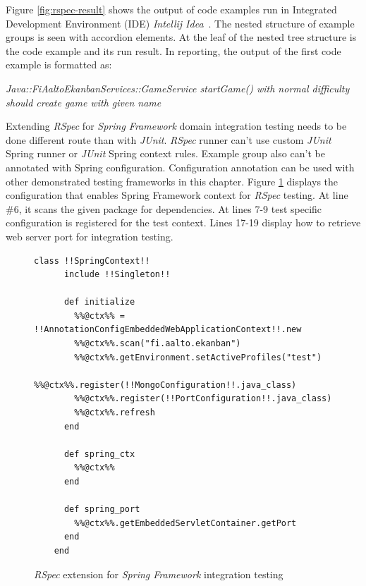     Figure \ref{fig:rspec-result} shows the output of code examples run in Integrated Development Environment (IDE) \textit{Intellij Idea}~\cite{intellij}.
    The nested structure of example groups
    is seen with accordion elements. At the leaf of the nested tree structure is the code example and its run result. In
    reporting, the output of the first code example is formatted as:
    \begin{center}
    \textit{Java::FiAaltoEkanbanServices::GameService startGame() with normal difficulty should create game with given name}
    \end{center}

    Extending \textit{RSpec} for \textit{Spring Framework} domain integration testing needs to be done different route than with \textit{JUnit}. \textit{RSpec}
    runner can't use custom \textit{JUnit} Spring runner or \textit{JUnit} Spring context rules. Example group also can't be annotated with
    Spring configuration. Configuration annotation can be used with other demonstrated testing frameworks in this chapter. Figure \ref{fig:rspec-config}
    displays the configuration that enables Spring Framework context for \textit{RSpec} testing. At line \#6, it scans the given
    package for dependencies. At lines 7-9 test specific configuration is registered for the test context. Lines 17-19
    display how to retrieve web server port for integration testing.

    \begin{figure}[H]
        \begin{lstlisting}[style=ruby]
    class !!SpringContext!!
      include !!Singleton!!

      def initialize
        %%@ctx%% = !!AnnotationConfigEmbeddedWebApplicationContext!!.new
        %%@ctx%%.scan("fi.aalto.ekanban")
        %%@ctx%%.getEnvironment.setActiveProfiles("test")
        %%@ctx%%.register(!!MongoConfiguration!!.java_class)
        %%@ctx%%.register(!!PortConfiguration!!.java_class)
        %%@ctx%%.refresh
      end

      def spring_ctx
        %%@ctx%%
      end

      def spring_port
        %%@ctx%%.getEmbeddedServletContainer.getPort
      end
    end
        \end{lstlisting}
        \caption{\textit{RSpec} extension for \textit{Spring Framework} integration testing}
        \label{fig:rspec-config}
    \end{figure}

    \restoregeometry

